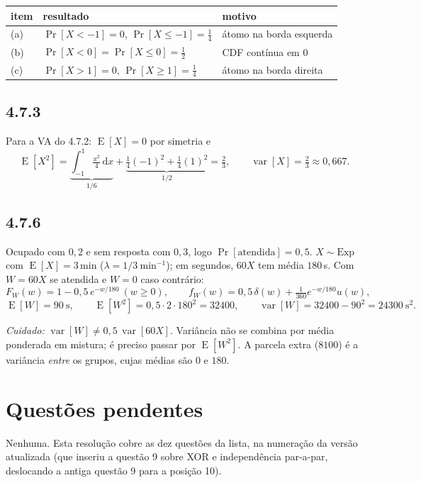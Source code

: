 \documentclass[11pt,a4paper]{article}
\newcommand{\dd}{\,\mathrm{d}}
\renewcommand{\Pr}{\operatorname{Pr}}
\DeclareMathOperator{\E}{E}
\DeclareMathOperator{\var}{var}
\begin{document}
\begin{center}
\begin{tabular}{lll}
\toprule
item & resultado & motivo \\
\midrule
(a) & $\Pr[X<-1]=0$, $\Pr[X\le-1]=\tfrac14$ & átomo na borda esquerda \\
(b) & $\Pr[X<0]=\Pr[X\le0]=\tfrac12$ & CDF contínua em $0$ \\
(c) & $\Pr[X>1]=0$, $\Pr[X\ge1]=\tfrac14$ & átomo na borda direita \\
\bottomrule
\end{tabular}
\end{center}

\subsection*{4.7.3}
Para a VA do 4.7.2: $\E[X]=0$ por simetria e
\[
\E[X^2]=\underbrace{\int_{-1}^{1}\tfrac{x^2}{4}\dd x}_{1/6}
+\underbrace{\tfrac14(-1)^2+\tfrac14(1)^2}_{1/2}=\tfrac23,
\qquad \var[X]=\tfrac23\approx0{,}667 .
\]

\subsection*{4.7.6}
Ocupado com $0{,}2$ e sem resposta com $0{,}3$, logo
$\Pr[\text{atendida}]=0{,}5$. $X\sim\text{Exp}$ com $\E[X]=3$\,min
($\lambda=1/3\ \mathrm{min^{-1}}$); em segundos, $60X$ tem média $180$\,s.
Com $W=60X$ se atendida e $W=0$ caso contrário:
\[
F_W(w)=1-0{,}5\,e^{-w/180}\ (w\ge0),
\qquad
f_W(w)=0{,}5\,\delta(w)+\tfrac1{360}e^{-w/180}u(w),
\]
\[
\E[W]=90\ \mathrm{s},
\qquad
\E[W^2]=0{,}5\cdot2\cdot180^2=32400,
\qquad
\var[W]=32400-90^2=24300\ \mathrm{s^2}.
\]

\emph{Cuidado:} $\var[W]\ne 0{,}5\,\var[60X]$. Variância não se combina por média
ponderada em mistura; é preciso passar por $\E[W^2]$. A parcela extra
($8100$) é a variância \emph{entre} os grupos, cujas médias são $0$ e $180$.

\section{Questões pendentes}

Nenhuma. Esta resolução cobre as dez questões da lista, na numeração da
versão atualizada (que inseriu a questão 9 sobre XOR e independência par-a-par,
deslocando a antiga questão 9 para a posição 10).
\end{document}
